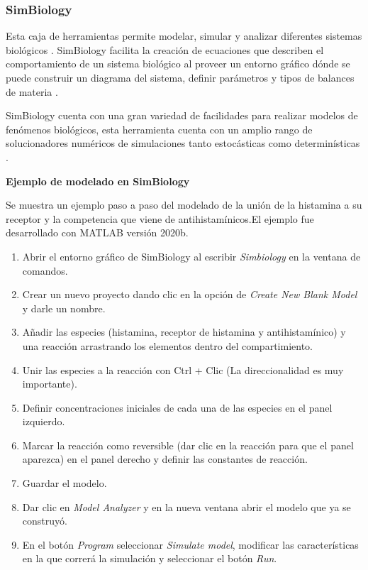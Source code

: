 \documentclass[11pt, letterpaper, spanish]{article}
\begin{document}
{{        \subsubsection{SimBiology}
        \par{Esta caja de herramientas permite modelar, simular y analizar diferentes sistemas biológicos \cite{Kirouac2019}. SimBiology facilita la creación de ecuaciones que describen el comportamiento de un sistema biológico al proveer un entorno gráfico dónde se puede construir un diagrama del sistema, definir parámetros y tipos de balances de materia \cite{Feigelman2016}.}
        \par{SimBiology cuenta con una gran variedad de facilidades para realizar modelos de fenómenos biológicos, esta herramienta cuenta con un amplio rango de solucionadores numéricos de simulaciones tanto estocásticas como  determinísticas \cite{Ullah2006}.}\\
        \par{\textbf{Ejemplo de modelado en SimBiology}}
        \par{Se muestra un ejemplo paso a paso del modelado de la unión de la histamina a su receptor y la competencia que viene de antihistamínicos.El ejemplo fue desarrollado con MATLAB versión 2020b.}
            \begin{enumerate}[1.]
                \item Abrir el entorno gráfico de SimBiology al escribir \textit{Simbiology} en la ventana de comandos.
                \item Crear un nuevo proyecto dando clic en la opción de \textit{Create New Blank Model} y darle un nombre.
                \item Añadir las especies (histamina, receptor de histamina y antihistamínico) y una reacción arrastrando los elementos dentro del compartimiento.
                \item Unir las especies a la reacción con Ctrl + Clic (La direccionalidad es muy importante).
                \item Definir concentraciones iniciales de cada una de las especies en el panel izquierdo.
                \item Marcar la reacción como reversible (dar clic en la reacción para que el panel aparezca) en el panel derecho y definir las constantes de reacción. 
                \item Guardar el modelo.
                \item Dar clic en \textit{Model Analyzer} y en la nueva ventana abrir el modelo que ya se construyó.
                \item En el botón \textit{Program} seleccionar \textit{Simulate model}, modificar las características en la que correrá la simulación y seleccionar el botón \textit{Run}.
            \end{enumerate}
}}
\end{document}
